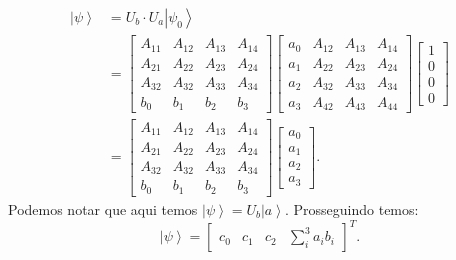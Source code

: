 \begin{equation}
\begin{split}
\left|\psi\right\rangle & =U_{b}\cdot U_{a}\left|\psi_{0}\right\rangle \\
&= \left[\begin{array}{cccc}
A_{11} & A_{12} & A_{13} & A_{14}\\
A_{21} & A_{22} & A_{23} & A_{24}\\
A_{32} & A_{32} & A_{33} & A_{34}\\
b_{0} & b_{1} & b_{2} & b_{3}
\end{array}\right]\left[\begin{array}{cccc}
a_{0} & A_{12} & A_{13} & A_{14}\\
a_{1} & A_{22} & A_{23} & A_{24}\\
a_{2} & A_{32} & A_{33} & A_{34}\\
a_{3} & A_{42} & A_{43} & A_{44}
\end{array}\right]\left[\begin{array}{c}
1\\
0\\
0\\
0
\end{array}\right] \\
& = \left[\begin{array}{cccc}
 A_{11} & A_{12} & A_{13} & A_{14}\\
A_{21} & A_{22} & A_{23} & A_{24}\\
A_{32} & A_{32} & A_{33} & A_{34}\\
b_{0} & b_{1} & b_{2} & b_{3}
\end{array}\right]\left[\begin{array}{c}
a_{0}\\
a_{1}\\
a_{2}\\
a_{3}
\end{array}\right].
\end{split}
 \end{equation}
Podemos notar que aqui temos $\left|\psi\right\rangle =U_{b}\left|a\right\rangle $. Prosseguindo temos:
\begin{equation}
\left|\psi\right\rangle =\left[\begin{array}{cccc}
c_{0} & c_{1} & c_{2} & \sum_{i}^{3}a_{i}b_{i}\end{array}\right]^{T}
. \end{equation}

